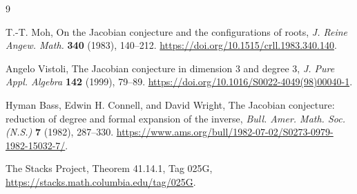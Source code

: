 \documentclass[11pt]{article}
\theoremstyle{remark}
\begin{document}
\begin{thebibliography}{9}

T.-T. Moh,
\newblock On the Jacobian conjecture and the configurations of roots,
\newblock \emph{J. Reine Angew. Math.} \textbf{340} (1983), 140--212.
\newblock \url{https://doi.org/10.1515/crll.1983.340.140}.

Angelo Vistoli,
\newblock The Jacobian conjecture in dimension 3 and degree 3,
\newblock \emph{J. Pure Appl. Algebra} \textbf{142} (1999), 79--89.
\newblock \url{https://doi.org/10.1016/S0022-4049(98)00040-1}.

Hyman Bass, Edwin H. Connell, and David Wright,
\newblock The Jacobian conjecture: reduction of degree and formal expansion
of the inverse,
\newblock \emph{Bull. Amer. Math. Soc. (N.S.)} \textbf{7} (1982), 287--330.
\newblock
\url{https://www.ams.org/bull/1982-07-02/S0273-0979-1982-15032-7/}.

The Stacks Project,
\newblock Theorem 41.14.1, Tag 025G,
\newblock \url{https://stacks.math.columbia.edu/tag/025G}.

\end{thebibliography}
\end{document}
